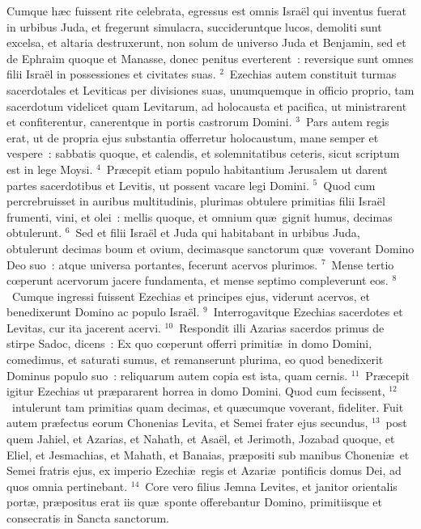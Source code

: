 \bchapter
\lettrine[lines=3,image=true,loversize=0.05,lraise=-0.03]{C}{}umque h\ae c fuissent rite celebrata, egressus est omnis Isra\"el qui inventus fuerat in urbibus Juda, et fregerunt simulacra, succideruntque lucos, demoliti sunt excelsa, et altaria destruxerunt, non solum de universo Juda et Benjamin, sed et de Ephraim quoque et Manasse, donec penitus everterent~: reversique sunt omnes filii Isra\"el in possessiones et civitates suas.
${}^{2}$~Ezechias autem constituit turmas sacerdotales et Leviticas per divisiones suas, unumquemque in officio proprio, tam sacerdotum videlicet quam Levitarum, ad holocausta et pacifica, ut ministrarent et confiterentur, canerentque in portis castrorum Domini.
${}^{3}$~Pars autem regis erat, ut de propria ejus substantia offerretur holocaustum, mane semper et vespere~: sabbatis quoque, et calendis, et solemnitatibus ceteris, sicut scriptum est in lege Moysi.
${}^{4}$~Pr\ae cepit etiam populo habitantium Jerusalem ut darent partes sacerdotibus et Levitis, ut possent vacare legi Domini.
${}^{5}$~Quod cum percrebruisset in auribus multitudinis, plurimas obtulere primitias filii Isra\"el frumenti, vini, et olei~: mellis quoque, et omnium qu\ae\ gignit humus, decimas obtulerunt.
${}^{6}$~Sed et filii Isra\"el et Juda qui habitabant in urbibus Juda, obtulerunt decimas boum et ovium, decimasque sanctorum qu\ae\ voverant Domino Deo suo~: atque universa portantes, fecerunt acervos plurimos.
${}^{7}$~Mense tertio cœperunt acervorum jacere fundamenta, et mense septimo compleverunt eos.
${}^{8}$~Cumque ingressi fuissent Ezechias et principes ejus, viderunt acervos, et benedixerunt Domino ac populo Isra\"el.
${}^{9}$~Interrogavitque Ezechias sacerdotes et Levitas, cur ita jacerent acervi.
${}^{10}$~Respondit illi Azarias sacerdos primus de stirpe Sadoc, dicens~: Ex quo cœperunt offerri primiti\ae\ in domo Domini, comedimus, et saturati sumus, et remanserunt plurima, eo quod benedixerit Dominus populo suo~: reliquarum autem copia est ista, quam cernis.
${}^{11}$~Pr\ae cepit igitur Ezechias ut pr\ae pararent horrea in domo Domini. Quod cum fecissent,
${}^{12}$~intulerunt tam primitias quam decimas, et qu\ae cumque voverant, fideliter. Fuit autem pr\ae fectus eorum Chonenias Levita, et Semei frater ejus secundus,
${}^{13}$~post quem Jahiel, et Azarias, et Nahath, et Asa\"el, et Jerimoth, Jozabad quoque, et Eliel, et Jesmachias, et Mahath, et Banaias, pr\ae positi sub manibus Choneni\ae\ et Semei fratris ejus, ex imperio Ezechi\ae\ regis et Azari\ae\ pontificis domus Dei, ad quos omnia pertinebant.
${}^{14}$~Core vero filius Jemna Levites, et janitor orientalis port\ae , pr\ae positus erat iis qu\ae\ sponte offerebantur Domino, primitiisque et consecratis in Sancta sanctorum.

